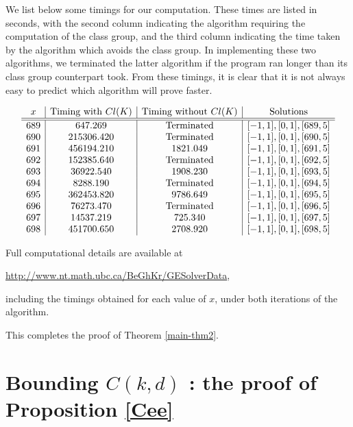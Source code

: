 We list below some timings for our computation. These times are listed in seconds, with the second column indicating the algorithm requiring the computation of the class group, and the third column indicating the time taken by the algorithm which avoids the class group. In implementing these two algorithms, we terminated the latter algorithm if the program ran longer than its class group counterpart took. From these timings, it is clear that it is not always easy to predict which algorithm will prove faster. 

\[\begin{array}{c | c| c|c}
x & \text{Timing with } Cl(K) & \text{Timing without } Cl(K) & \text{Solutions} \\ \hline \hline
689 & 647.269 	& \text{Terminated} & [ -1, 1 ],[ 0, 1 ],[ 689, 5 ]  \\
690  & 215306.420 & \text{Terminated} & [ -1, 1 ],[ 0, 1 ],[ 690, 5 ] \\
691  & 456194.210 &   1821.049 & [ -1, 1 ],[ 0, 1 ],[ 691, 5 ] \\
692  & 152385.640 & \text{Terminated} & [ -1, 1 ],[ 0, 1 ],[ 692, 5 ] \\
693  & 36922.540  &    1908.230  & [ -1, 1 ],[ 0, 1 ],[ 693, 5 ]  \\
694  & 8288.190     & \text{Terminated}    &   [ -1, 1 ],[ 0, 1 ],[ 694, 5 ]   \\
695  & 362453.820  &   9786.649  &  [ -1, 1 ],[ 0, 1 ],[ 695, 5 ]  \\
696  & 76273.470 & \text{Terminated}  &    [ -1, 1 ],[ 0, 1 ],[ 696, 5 ] \\
697  & 14537.219  &    725.340  & [ -1, 1 ],[ 0, 1 ],[ 697, 5 ]  \\
698  & 451700.650 &    2708.920 &    [ -1, 1 ],[ 0, 1 ],[ 698, 5 ] \\
\end{array}\]
 
Full computational details are available at
\begin{center}
\url{http://www.nt.math.ubc.ca/BeGhKr/GESolverData},
\end{center}
including the timings obtained for each value of $x$, under both iterations of the algorithm. 

This completes the proof of Theorem \ref{main-thm2}.


\section{Bounding $C(k,d)$ : the proof of Proposition \ref{Cee}} \label{Cee-proof}


